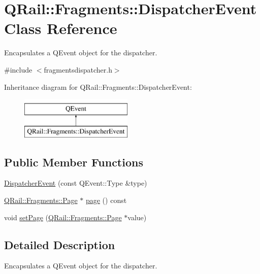 \hypertarget{classQRail_1_1Fragments_1_1DispatcherEvent}{}\section{Q\+Rail\+::Fragments\+::Dispatcher\+Event Class Reference}
\label{classQRail_1_1Fragments_1_1DispatcherEvent}


Encapsulates a Q\+Event object for the dispatcher.  




{\ttfamily \#include $<$fragmentsdispatcher.\+h$>$}

Inheritance diagram for Q\+Rail\+::Fragments\+::Dispatcher\+Event\+:\begin{figure}[H]
\begin{center}
\leavevmode
\includegraphics[height=2.000000cm]{classQRail_1_1Fragments_1_1DispatcherEvent}
\end{center}
\end{figure}
\subsection*{Public Member Functions}
\begin{DoxyCompactItemize}
\item 
\mbox{\hyperlink{classQRail_1_1Fragments_1_1DispatcherEvent_ad98ef5840c2b15977eb5c5c92204342d}{Dispatcher\+Event}} (const Q\+Event\+::\+Type \&type)
\item 
\mbox{\hyperlink{classQRail_1_1Fragments_1_1Page}{Q\+Rail\+::\+Fragments\+::\+Page}} $\ast$ \mbox{\hyperlink{classQRail_1_1Fragments_1_1DispatcherEvent_a05e755262183efedfa43226a8ff3e752}{page}} () const
\item 
void \mbox{\hyperlink{classQRail_1_1Fragments_1_1DispatcherEvent_aa6808a5d6c31f9e9f86337493342f307}{set\+Page}} (\mbox{\hyperlink{classQRail_1_1Fragments_1_1Page}{Q\+Rail\+::\+Fragments\+::\+Page}} $\ast$value)
\end{DoxyCompactItemize}


\subsection{Detailed Description}
Encapsulates a Q\+Event object for the dispatcher. 

